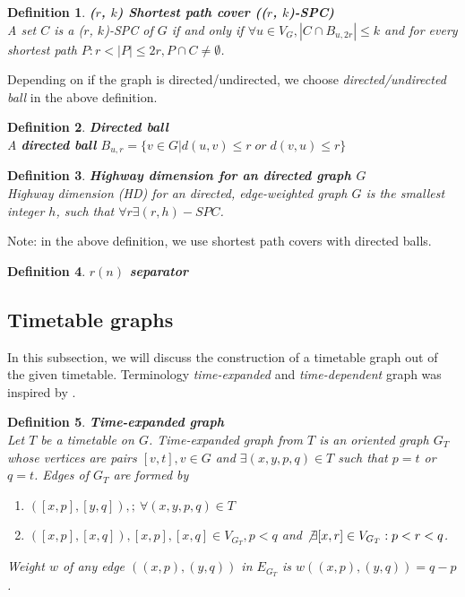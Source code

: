 \documentclass[a4paper]{article}
\newtheorem{definition}{Definition}
\begin{document}
            \begin{definition}
                \textbf{($r$, $k$) Shortest path cover (($r$, $k$)-SPC)} ~\cite{highwaydim10} \\
                A set $C$ is a ($r$, $k$)-SPC of $G$ if and only if $\forall u \in V_{G}, |C \cap B_{u, 2r}| \leq k$ and for every shortest path $P: r < |P| \leq 2r, P \cap C \neq \emptyset$.
            \end{definition}

            \noindent Depending on if the graph is directed/undirected, we choose \emph{directed/undirected ball} in the above definition.
            \begin{definition}
                \textbf{Directed ball} \\
                A \textbf{directed ball} $B_{u, r} = \{v \in G | d(u, v) \leq r \; or \; d(v, u) \leq r\}$
            \end{definition}

            \begin{definition}
                \textbf{Highway dimension for an directed graph $G$} ~\cite{highwaydim10} \\
                Highway dimension (HD) for an directed, edge-weighted graph $G$ is the smallest integer $h$, such that $\forall r \exists (r, h)-SPC$.
            \end{definition}

            \noindent Note: in the above definition, we use shortest path covers with directed balls.

            \begin{definition}
                \textbf{$r(n)$ separator}
            \end{definition}

        \subsection{Timetable graphs}
        In this subsection, we will discuss the construction of a timetable graph out of the given timetable. Terminology \emph{time-expanded} and \emph{time-dependent} graph was inspired by \cite{timetablemodelsalgs07}. %

        \begin{definition}
            \textbf{Time-expanded graph} \\
            Let $T$ be a timetable on $G$. Time-expanded graph from $T$ is an oriented graph $G_{T}$ whose vertices are pairs $[v, t], v \in G$ and $\exists (x, y, p, q) \in T$ such that $p = t$ or $q = t$. Edges of $G_{T}$ are formed by
            \begin{enumerate}
                \item $([x, p], [y, q]), ;\ \forall (x, y, p, q) \in T$
                \item $([x, p], [x, q]), [x, p], [x, q] \in V_{G_{T}}, p < q$ and $\not \exists [x, r] \in V_{G_{T}}: p < r < q$.
            \end{enumerate}
            Weight $w$ of any edge $((x, p), (y, q))$ in $E_{G_{T}}$ is $w((x, p), (y, q)) = q - p$.
        \end{definition}
\end{document}

